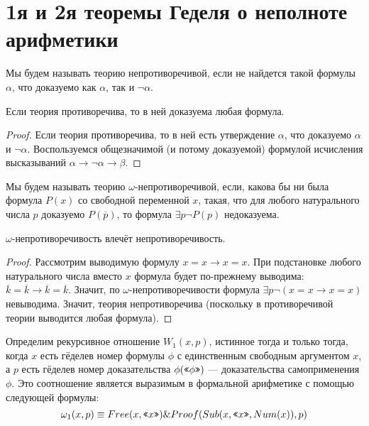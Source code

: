 \section{1я и 2я теоремы Геделя о неполноте арифметики}

\begin{definition}Мы будем называть теорию непротиворечивой, если
не найдется такой формулы $\alpha$, что доказуемо как $\alpha$, так и $\neg \alpha$.
\end{definition}

\begin{lemma}
Если теория противоречива, то в ней доказуема любая формула.
\end{lemma}
\begin{proof}
Если теория противоречива, то в ней есть утверждение $\alpha$, что доказуемо $\alpha$ и $\neg \alpha$.
Воспользуемся общезначимой (и потому доказуемой) формулой исчисления высказываний 
$\alpha \rightarrow \neg \alpha \rightarrow \beta$.
\end{proof}

\begin{definition}Мы будем называть теорию $\omega$-непротиворечивой,
если, какова бы ни была формула $P(x)$ со свободной переменной $x$, 
такая, что для любого натурального числа $p$ доказуемо $P(\overline{p})$, 
то формула $\exists p \neg P(p)$ недоказуема.
\end{definition}

\begin{lemma}
$\omega$-непротиворечивость влечёт непротиворечивость.
\end{lemma}

\begin{proof}
Рассмотрим выводимую формулу $x=x \rightarrow x=x$.
При подстановке любого натурального числа вместо $x$
формула будет по-прежнему выводима: $\overline{k} = \overline{k} \rightarrow \overline{k}=\overline{k}$.
Значит, по $\omega$-непротиворечивости формула $\exists p \neg (x=x \rightarrow x=x)$ невыводима.
Значит, теория непротиворечива (поскольку в противоречивой теории выводится любая формула).
\end{proof}

Определим рекурсивное отношение $W_1(x,p)$,
истинное тогда и только тогда, когда $x$ есть гёделев номер формулы
$\phi$ с единственным свободным аргументом $x$, а $p$ есть гёделев номер 
доказательства $\phi(\texttt{<<}\phi\texttt{>>})$ --- доказательства 
самоприменения $\phi$. 
Это соотношение является выразимым в формальной арифметике с помощью следующей формулы:
$$\omega_1(x,p) \equiv Free(x,\texttt{<<}x\texttt{>>}) \& Proof (Sub(x,\texttt{<<}x\texttt{>>},Num(x)),p)$$

